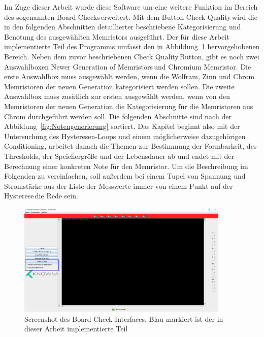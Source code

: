 Im Zuge dieser Arbeit wurde diese Software um eine weitere Funktion im Bereich des sogenannten \glqq Board Checks\grqq\,erweitert. Mit dem Button \glqq Check Quality\grqq\,wird die in den folgenden Abschnitten detaillierter beschriebene Kategorisierung und Benotung des ausgewählten Memristors ausgeführt. Der für diese Arbeit implementierte Teil des Programms umfasst den in Abbildung~\ref{fig:Programm} hervorgehobenen Bereich. Neben dem zuvor beschriebenen \glqq Check Quality\grqq\,Button, gibt es noch zwei Auswahlboxen \glqq Newer Generation of Memristors\grqq\,und \glqq Chromium Memristor\grqq. Die erste Auswahlbox muss ausgewählt werden, wenn die Wolfram, Zinn und Chrom Memristoren der neuen Generation kategorisiert werden sollen. Die zweite Auswahlbox muss zusätlich zur ersten ausgewählt werden, wenn von den Memristoren der neuen Generation die Kategorisierung für die Memristoren aus Chrom durchgeführt werden soll. Die folgenden Abschnitte sind nach der Abbildung~\ref{fig:Notengenerierung}
sortiert. Das Kapitel beginnt also mit der Untersuchung des Hysteresen-Loops und einem möglicherweise dazugehörigen Conditioning, arbeitet danach die Themen zur Bestimmung der Formbarkeit, des Thresholds, der Speichergröße und der Lebensdauer ab und endet mit der Berechnung einer konkreten Note für den Memristor. Um die Beschreibung im Folgenden zu vereinfachen, soll außerdem bei einem Tupel von Spannung und Stromstärke aus der Liste der Messwerte immer von einem \glqq Punkt auf der Hysterese\grqq\,die Rede sein.
\begin{figure}
  \centering
    \includegraphics[width=0.9\textwidth]{images/Programm.png}
  \caption{Screenshot des Board Check Interfaces. Blau markiert ist der in dieser Arbeit implementierte Teil}
  \label{fig:Programm}
\end{figure}

